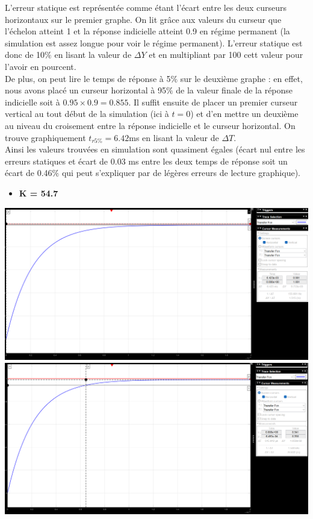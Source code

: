 \documentclass[12pt]{article}
\begin{document}
\normalsize L'erreur statique est représentée comme étant l'écart entre les deux curseurs horizontaux sur le premier graphe. On lit grâce aux valeurs du curseur que l'échelon atteint 1 et la réponse indicielle atteint 0.9 en régime permanent (la simulation est assez longue pour voir le régime permanent). L'erreur statique est donc de 10$\%$ en lisant la valeur de $\Delta Y$ et en multipliant par 100 cett valeur pour l'avoir en pourcent.
\\De plus, on peut lire le temps de réponse à 5$\%$ sur le deuxième graphe : en effet, nous avons placé un curseur horizontal à 95$\%$ de la valeur finale de la réponse indicielle soit à $0.95\times0.9 = 0.855$.
Il suffit ensuite de placer un premier curseur vertical au tout début de la simulation (ici à $t=0$) et d'en mettre un deuxième au niveau du croisement entre la réponse indicielle et le curseur horizontal. On trouve graphiquement $t_{r5\%} = 6.42$ms en lisant la valeur de $\Delta T$.
\\Ainsi les valeurs trouvées en simulation sont quasiment égales (écart nul entre les erreurs statiques et écart de 0.03 ms entre les deux temps de réponse soit un écart de 0.46$\%$ qui peut s'expliquer par de légères erreurs de lecture graphique).
\newpage
\begin{itemize}
    \item \bf \large K = 54.7
\end{itemize}
\begin{center}
    \includegraphics[width = 16 cm]{TP2 Simulink/Syst_1/Erreur_statique_syst_1_K=54.7.png}
    \includegraphics[width = 16 cm]{TP2 Simulink/Syst_1/tr5prct_syst_1_K=54.7.png}
\end{center}
\end{document}
